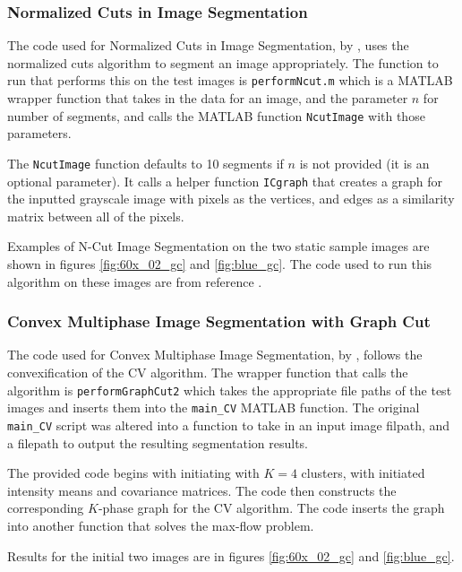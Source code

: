 \documentclass{article}
\begin{document}
\subsubsection*{Normalized Cuts in Image Segmentation}

The code used for Normalized Cuts in Image Segmentation, by \cite{ncut_code}, uses the normalized cuts algorithm to segment an image appropriately. The function to run that performs this on the test images is \texttt{performNcut.m} which is a MATLAB wrapper function that takes in the data for an image, and the parameter $n$ for number of segments, and calls the MATLAB function \texttt{NcutImage} with those parameters.

The \texttt{NcutImage} function defaults to 10 segments if $n$ is not provided (it is an optional parameter). It calls a helper function \texttt{ICgraph} that creates a graph for the inputted grayscale image with pixels as the vertices, and edges as a similarity matrix between all of the pixels.


Examples of N-Cut Image Segmentation on the two static sample images are shown in figures \ref{fig:60x_02_gc} and \ref{fig:blue_gc}. The code used to run this algorithm on these images are from reference \cite{ncut_code}.






\subsubsection*{Convex Multiphase Image Segmentation with Graph Cut}

 The code used for Convex Multiphase Image Segmentation, by \cite{jun}, follows the convexification of the CV algorithm. The wrapper function that calls the algorithm is \texttt{performGraphCut2} which takes the appropriate file paths of the test images and inserts them into the \texttt{main\_CV} MATLAB function. The original \texttt{main\_CV} script was altered into a function to take in an input image filpath, and a filepath to output the resulting segmentation results.

The provided code begins with initiating with $K=4$ clusters, with initiated intensity means and covariance matrices. The code then constructs the corresponding $K$-phase graph for the CV algorithm. The code inserts the graph into another function that solves the max-flow problem.

Results for the initial two images are in figures \ref{fig:60x_02_gc} and \ref{fig:blue_gc}.
\end{document}
